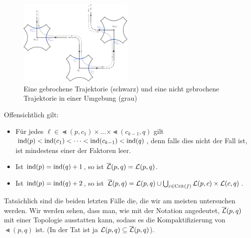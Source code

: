 \begin{figure}[H]
    \centering
    \includegraphics[width=0.5\textwidth]{../resources/broken-trajectories.png}
    \caption{Eine gebrochene Trajektorie (schwarz) und eine nicht gebrochene Trajektorie 
    in einer Umgebung (grau)}
    \label{fig: gebrochene trajektorien}
\end{figure}


Offensichtlich gilt:
\begin{itemize}
    \item Für jedes $\ell \in \Lt (p, c_1) \times \dots \times \Lt (c_{k - 1}, q)$ gilt 
        ${ \operatorname{ind} } (p) < { \operatorname{ind} } (c_1) < \dots < { \operatorname{ind} } (c_{k - 1}) < { \operatorname{ind} } (q)$, denn falls dies nicht
        der Fall ist, ist mindestens einer der Faktoren leer. 
    \item Ist ${ \operatorname{ind} } (p) = { \operatorname{ind} } (q) + 1$, so ist ${\overline{\mathcal{L}} } (p, q) = { \mathcal{L} } (p, q)$.
    \item Ist ${ \operatorname{ind} } (p) = { \operatorname{ind} } (q) + 2$, so ist 
        ${\overline{\mathcal{L}} } (p, q) = { \mathcal{L} } (p, q) \cup \bigcup_{c \in { \operatorname{Crit} } (f)} { \mathcal{L} }(p, c) \times { \mathcal{L} }(c, q)$.
\end{itemize}
Tatsächlich sind die beiden letzten Fälle die, die wir am meisten untersuchen werden.
Wir werden sehen, dass man, wie mit der Notation angedeutet, ${\overline{\mathcal{L}} } (p, q)$ mit einer Topologie 
ausstatten kann, sodass es die Kompaktifizierung von $\Lt (p, q)$ ist. (In der Tat ist ja 
${ \mathcal{L} } (p, q) \subseteq {\overline{\mathcal{L}} } (p, q)$).

